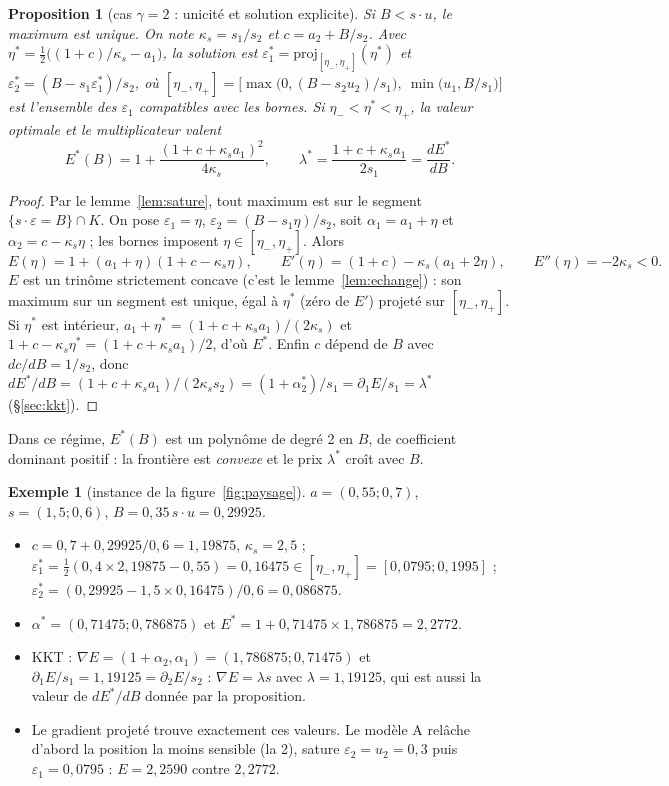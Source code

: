 \documentclass[11pt,a4paper]{article}
\theoremstyle{plain}
\newtheorem{proposition}{Proposition}
\theoremstyle{definition}
\newtheorem{exemple}{Exemple}
\begin{document}
\begin{proposition}[cas $\gamma=2$ : unicité et solution explicite]\label{prop:gamma2}
Si $B<s\cdot u$, le maximum est unique. On note $\kappa_s=s_1/s_2$ et $c=a_2+B/s_2$. Avec $\eta^*=\tfrac12\big((1+c)/\kappa_s-a_1\big)$, la solution est $\varepsilon_1^*=\mathrm{proj}_{[\eta_-,\eta_+]}(\eta^*)$ et $\varepsilon_2^*=(B-s_1\varepsilon_1^*)/s_2$, où $[\eta_-,\eta_+]=\big[\max\big(0,(B-s_2u_2)/s_1\big),\ \min\big(u_1,B/s_1\big)\big]$ est l'ensemble des $\varepsilon_1$ compatibles avec les bornes. Si $\eta_-<\eta^*<\eta_+$, la valeur optimale et le multiplicateur valent
\[E^*(B)=1+\frac{(1+c+\kappa_sa_1)^2}{4\kappa_s},\qquad \lambda^*=\frac{1+c+\kappa_sa_1}{2s_1}=\frac{dE^*}{dB}.\]
\end{proposition}
\begin{proof}
Par le lemme~\ref{lem:sature}, tout maximum est sur le segment $\{s\cdot\varepsilon=B\}\cap K$. On pose $\varepsilon_1=\eta$, $\varepsilon_2=(B-s_1\eta)/s_2$, soit $\alpha_1=a_1+\eta$ et $\alpha_2=c-\kappa_s\eta$ ; les bornes imposent $\eta\in[\eta_-,\eta_+]$. Alors
\[E(\eta)=1+(a_1+\eta)(1+c-\kappa_s\eta),\qquad E'(\eta)=(1+c)-\kappa_s(a_1+2\eta),\qquad E''(\eta)=-2\kappa_s<0.\]
$E$ est un trinôme strictement concave (c'est le lemme~\ref{lem:echange}) : son maximum sur un segment est unique, égal à $\eta^*$ (zéro de $E'$) projeté sur $[\eta_-,\eta_+]$. Si $\eta^*$ est intérieur, $a_1+\eta^*=(1+c+\kappa_sa_1)/(2\kappa_s)$ et $1+c-\kappa_s\eta^*=(1+c+\kappa_sa_1)/2$, d'où $E^*$. Enfin $c$ dépend de $B$ avec $dc/dB=1/s_2$, donc $dE^*/dB=(1+c+\kappa_sa_1)/(2\kappa_ss_2)=(1+\alpha_2^*)/s_1=\partial_1E/s_1=\lambda^*$ (§\ref{sec:kkt}).
\end{proof}
Dans ce régime, $E^*(B)$ est un polynôme de degré 2 en $B$, de coefficient dominant positif : la frontière est \emph{convexe} et le prix $\lambda^*$ croît avec $B$.

\begin{exemple}[instance de la figure~\ref{fig:paysage}]
$a=(0{,}55;0{,}7)$, $s=(1{,}5;0{,}6)$, $B=0{,}35\,s\cdot u=0{,}29925$.
\begin{itemize}
\item $c=0{,}7+0{,}29925/0{,}6=1{,}19875$, $\kappa_s=2{,}5$ ; $\varepsilon_1^*=\tfrac12(0{,}4\times2{,}19875-0{,}55)=0{,}16475\in[\eta_-,\eta_+]=[0{,}0795;0{,}1995]$ ; $\varepsilon_2^*=(0{,}29925-1{,}5\times0{,}16475)/0{,}6=0{,}086875$.
\item $\alpha^*=(0{,}71475;0{,}786875)$ et $E^*=1+0{,}71475\times1{,}786875=2{,}2772$.
\item KKT : $\nabla E=(1+\alpha_2,\alpha_1)=(1{,}786875;0{,}71475)$ et $\partial_1E/s_1=1{,}19125=\partial_2E/s_2$ : $\nabla E=\lambda s$ avec $\lambda=1{,}19125$, qui est aussi la valeur de $dE^*/dB$ donnée par la proposition.
\item Le gradient projeté trouve exactement ces valeurs. Le modèle A relâche d'abord la position la moins sensible (la 2), sature $\varepsilon_2=u_2=0{,}3$ puis $\varepsilon_1=0{,}0795$ : $E=2{,}2590$ contre $2{,}2772$.
\end{itemize}
\end{exemple}
\end{document}

